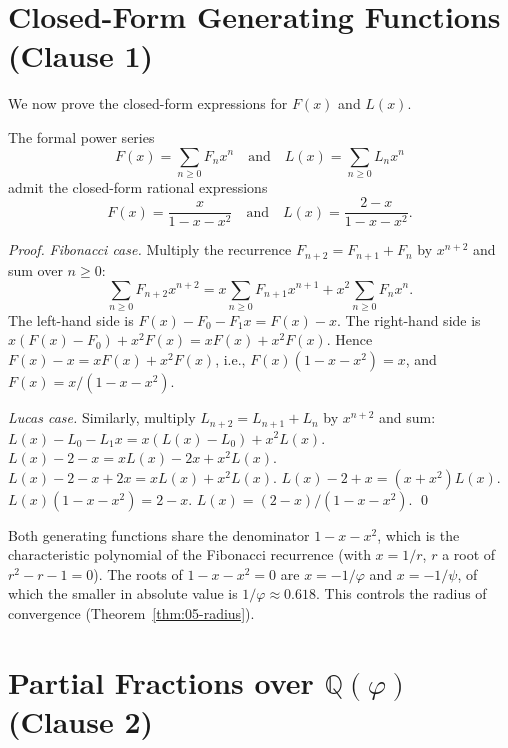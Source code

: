 \section{Closed-Form Generating Functions (Clause 1)}
\label{sec:05-closed-form}

We now prove the closed-form expressions for $F(x)$ and $L(x)$.

\begin{theorem}
\label{thm:05-genfn-closed}
The formal power series
\[
  F(x) = \sum_{n \ge 0} F_n x^n
  \quad\text{and}\quad
  L(x) = \sum_{n \ge 0} L_n x^n
\]
admit the closed-form rational expressions
\[
  F(x) = \frac{x}{1 - x - x^2}
  \quad\text{and}\quad
  L(x) = \frac{2 - x}{1 - x - x^2}.
\]
\end{theorem}

\begin{proof}
\emph{Fibonacci case.} Multiply the recurrence $F_{n+2} = F_{n+1} + F_n$
by $x^{n+2}$ and sum over $n \ge 0$:
\[
  \sum_{n \ge 0} F_{n+2} x^{n+2} = x \sum_{n \ge 0} F_{n+1} x^{n+1} + x^2 \sum_{n \ge 0} F_n x^n.
\]
The left-hand side is $F(x) - F_0 - F_1 x = F(x) - x$. The right-hand
side is $x (F(x) - F_0) + x^2 F(x) = x F(x) + x^2 F(x)$. Hence
$F(x) - x = x F(x) + x^2 F(x)$, i.e., $F(x)(1 - x - x^2) = x$, and
$F(x) = x / (1 - x - x^2)$.

\emph{Lucas case.} Similarly, multiply $L_{n+2} = L_{n+1} + L_n$ by
$x^{n+2}$ and sum:
$L(x) - L_0 - L_1 x = x (L(x) - L_0) + x^2 L(x)$.
$L(x) - 2 - x = x L(x) - 2x + x^2 L(x)$.
$L(x) - 2 - x + 2x = x L(x) + x^2 L(x)$.
$L(x) - 2 + x = (x + x^2) L(x)$.
$L(x)(1 - x - x^2) = 2 - x$.
$L(x) = (2 - x)/(1 - x - x^2)$. \qed
\end{proof}

\begin{remark}
Both generating functions share the denominator $1 - x - x^2$, which
is the characteristic polynomial of the Fibonacci recurrence (with
$x = 1/r$, $r$ a root of $r^2 - r - 1 = 0$). The roots of
$1 - x - x^2 = 0$ are $x = -1/\varphi$ and $x = -1/\psi$, of which
the smaller in absolute value is $1/\varphi \approx 0.618$. This
controls the radius of convergence (Theorem~\ref{thm:05-radius}).
\end{remark}

\section{Partial Fractions over $\mathbb{Q}(\varphi)$ (Clause 2)}
\label{sec:05-partial-frac}

